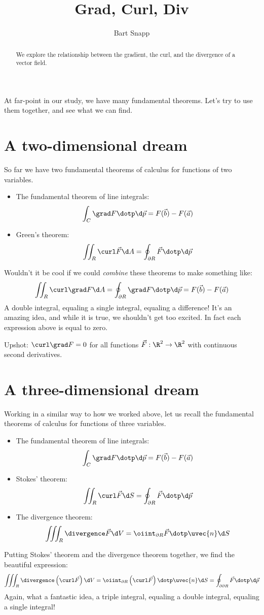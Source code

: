 \documentclass{ximera}
\author{Bart Snapp}
\title[Dig-In:]{Grad, Curl, Div}
\begin{document}
\begin{abstract}
  We explore the relationship between the gradient, the curl, and the
  divergence of a vector field.
\end{abstract}
\maketitle

At far-point in our study, we have many fundamental theorems. Let's
try to use them together, and see what we can find. 

\section{A two-dimensional dream}

So far we have two fundamental theorems of calculus for functions of
two variables.
\begin{itemize}
\item The fundamental theorem of line integrals:
  \[
  \int_C \grad F \dotp\d\vec{p} = F(\vec{b}) -F(\vec{a})
  \]
\item Green's theorem:
  \[
  \iint_R \curl \vec{F} \d A = \oint_{\partial R} \vec{F} \dotp \d \vec{p}
  \]
\end{itemize}
Wouldn't it be cool if we could \textit{combine} these theorems to
make something like:
\[
\iint_R \curl \grad F \d A = \oint_{\partial R} \grad F \dotp \d \vec{p} = F(\vec{b}) - F(\vec{a})
\]
A double integral, equaling a single integral, equaling a difference!
It's an amazing idea, and while it is true, we shouldn't get too
excited. In fact each expression above is equal to zero.

Upshot: $\curl\grad F = 0$ for all functions $\vec{F}:\R^2\to\R^2$
with continuous second derivatives.


\section{A three-dimensional dream}

Working in a similar way to how we worked above, let us recall the fundamental theorems of calculus for functions of three variables.

\begin{itemize}
\item The fundamental theorem of line integrals:
  \[
  \int_C \grad F \dotp\d\vec{p} = F(\vec{b}) - F(\vec{a}) 
  \]
\item Stokes' theorem:
  \[
  \iint_R \curl\vec{F} \d S = \oint_{\partial R} \vec{F} \dotp \d \vec{p}
  \]
\item The divergence theorem:
  \[
  \iiint_R \divergence\vec{F} \d V = \oiint_{\partial R} \vec{F}\dotp\uvec{n} \d S
  \]
\end{itemize}
Putting Stokes' theorem and the divergence theorem together, we find the beautiful expression:
\[
\iiint_R \divergence\left(\curl\vec{F}\right)\d V = \oiint_{\partial R} \left(\curl \vec{F}\right)\dotp \uvec{n} \d S = \oint_{\partial\partial R} \vec{F}\dotp \d \vec{p}
\]
Again, what a fantastic idea, a triple integral, equaling a double
integral, equaling a single integral!
\end{document}
